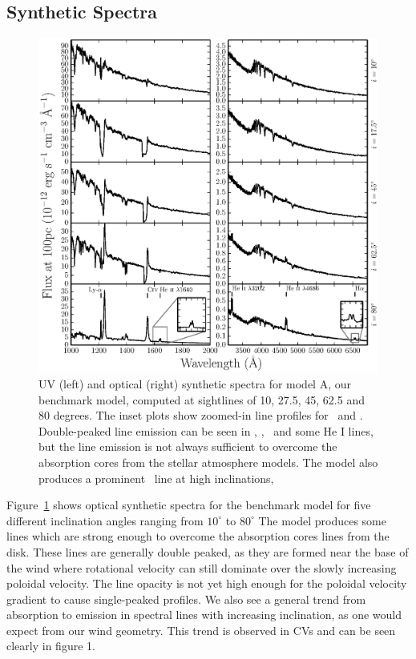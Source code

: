 \documentclass[preprint, a4paper, 11pt]{aastex}
\begin{document}
\subsection{Synthetic Spectra}

\begin{figure} %
\includegraphics[width=\textwidth]{figures/fig5_uv_opt.eps}
\caption{
UV (left) and optical (right) synthetic spectra for model A, our benchmark model,
computed at sightlines of 10, 27.5, 45, 62.5 and 80 degrees.	
The inset plots show zoomed-in line profiles for 
\heiiuv\ and \ha. Double-peaked line emission can be seen in 
\heiiuv, \heiiopt, \ha\ and some He I lines, but the 
line emission is not always sufficient to overcome the absorption
cores from the stellar atmosphere models. The model
also produces a prominent \heiioptnew\ line at high inclinations,
}
\label{spec}
\end{figure} %

Figure~\ref{spec} shows optical synthetic spectra for the benchmark 
model for five different inclination angles ranging from $10^\circ$ to $80^\circ$ 
The model produces some lines which are strong enough to overcome
the absorption cores lines from the disk. These lines are generally double peaked, 
as they are formed near the base of the wind where rotational velocity
can still dominate over the slowly increasing poloidal velocity. The line 
opacity is not yet high enough for the poloidal velocity gradient to 
cause single-peaked profiles. 
We also see a general trend from absorption to emission in spectral lines
with increasing inclination, as one would expect from our wind geometry.
This trend is observed in CVs and can be seen clearly in figure 1. 
\end{document}
